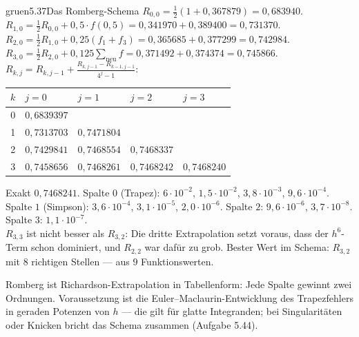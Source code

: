 \begin{loesungkarte}{gruen}{5.37}{Das Romberg-Schema}
$R_{0,0} = \frac12(1 + 0{,}367879) = 0{,}683940$. $R_{1,0} = \frac12R_{0,0} + 0{,}5\cdot f(0{,}5) = 0{,}341970 + 0{,}389400 = 0{,}731370$. $R_{2,0} = \frac12R_{1,0} + 0{,}25(f_1 + f_3) = 0{,}365685 + 0{,}377299 = 0{,}742984$. $R_{3,0} = \frac12R_{2,0} + 0{,}125\sum_{\text{neu}}f = 0{,}371492 + 0{,}374374 = 0{,}745866$.
$R_{k,j} = R_{k,j-1} + \frac{R_{k,j-1} - R_{k-1,j-1}}{4^{j} - 1}$:
\begin{center}\small
\begin{tabular}{c|llll}
$k$ & $j = 0$ & $j = 1$ & $j = 2$ & $j = 3$\\ \hline
0 & $0{,}6839397$ & & & \\
1 & $0{,}7313703$ & $0{,}7471804$ & & \\
2 & $0{,}7429841$ & $0{,}7468554$ & $0{,}7468337$ & \\
3 & $0{,}7458656$ & $0{,}7468261$ & $0{,}7468242$ & $0{,}7468240$
\end{tabular}
\end{center}
Exakt $0{,}7468241$. Spalte $0$ (Trapez): $6\cdot10^{-2}$, $1{,}5\cdot10^{-2}$, $3{,}8\cdot10^{-3}$, $9{,}6\cdot10^{-4}$. Spalte $1$ (Simpson): $3{,}6\cdot10^{-4}$, $3{,}1\cdot10^{-5}$, $2{,}0\cdot10^{-6}$. Spalte $2$: $9{,}6\cdot10^{-6}$, $3{,}7\cdot10^{-8}$. Spalte $3$: $1{,}1\cdot10^{-7}$. \\
$R_{3,3}$ ist nicht besser als $R_{3,2}$: Die dritte Extrapolation setzt voraus, dass der $h^{6}$-Term schon dominiert, und $R_{2,2}$ war dafür zu grob. Bester Wert im Schema: $R_{3,2}$ mit $8$ richtigen Stellen --- aus $9$ Funktionswerten.
\begin{mitnehmen}\kastentext
Romberg ist Richardson-Extrapolation in Tabellenform: Jede Spalte gewinnt zwei Ordnungen. Voraussetzung ist die Euler--Maclaurin-Entwicklung des Trapezfehlers in geraden Potenzen von $h$ --- die gilt für glatte Integranden; bei Singularitäten oder Knicken bricht das Schema zusammen (Aufgabe 5.44).
\end{mitnehmen}
\end{loesungkarte}

